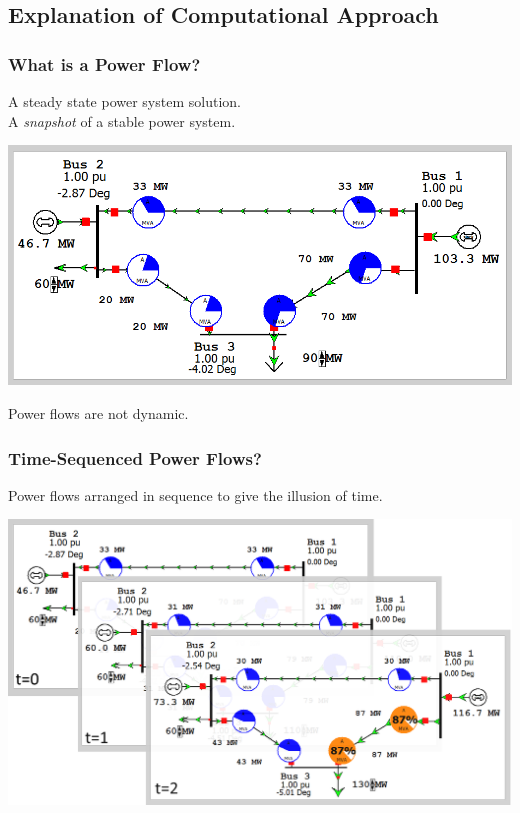 \documentclass[14pt, unknownkeysallowed]{beamer}
\begin{document}
\subsection{Explanation of Computational Approach}
\begin{frame}
\frametitle{What is a Power Flow?}
		A steady state power system solution.\\%
		A \emph{snapshot} of a stable power system. \\%
		

\begin{center}
	\includegraphics[width=.6\linewidth]{powerFlowSingle} 
\end{center}

	
		Power flows are not dynamic.

\end{frame}
\begin{frame}
\frametitle{Time-Sequenced Power Flows?}
Power flows arranged in sequence to give the illusion of time.\\
\begin{center}
	\includegraphics[width=.8\linewidth]{powerFlowSequence}
\end{center}
\end{frame}
\end{document}
